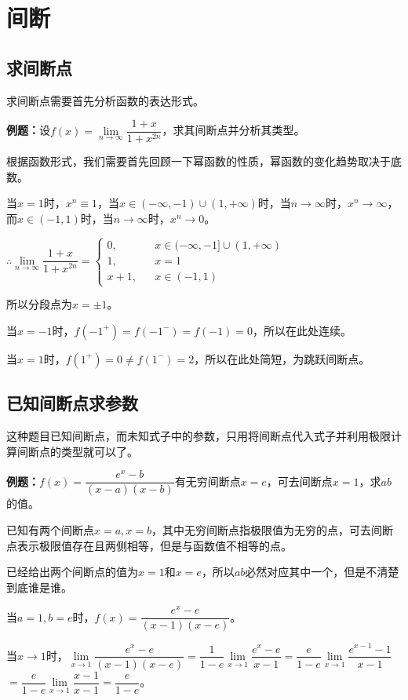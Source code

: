 \documentclass[UTF8, 12pt]{ctexart}
\begin{document}
\section{间断}

\subsection{求间断点}

求间断点需要首先分析函数的表达形式。

\textbf{例题：}设$f(x)=\lim\limits_{n\to\infty}\dfrac{1+x}{1+x^{2n}}$，求其间断点并分析其类型。

根据函数形式，我们需要首先回顾一下幂函数的性质，幂函数的变化趋势取决于底数。

当$x=1$时，$x^n\equiv 1$，当$x\in(-\infty,-1)\cup(1,+\infty)$时，当$n\to\infty$时，$x^n\to\infty$，而$x\in(-1,1)$时，当$n\to\infty$时，$x^n\to 0$。

$\therefore\lim\limits_{n\to\infty}\dfrac{1+x}{1+x^{2n}}=\left\{\begin{array}{lcl}
        0,   &  & x\in(-\infty,-1]\cup(1,+\infty) \\
        1,   &  & x=1                                        \\
        x+1, &  & x\in(-1,1)
    \end{array}
    \right.$

所以分段点为$x=\pm 1$。

当$x=-1$时，$f(-1^+)=f(-1^-)=f(-1)=0$，所以在此处连续。

当$x=1$时，$f(1^+)=0\neq f(1^-)=2$，所以在此处简短，为跳跃间断点。

\subsection{已知间断点求参数}

这种题目已知间断点，而未知式子中的参数，只用将间断点代入式子并利用极限计算间断点的类型就可以了。

\textbf{例题：}$f(x)=\dfrac{e^x-b}{(x-a)(x-b)}$有无穷间断点$x=e$，可去间断点$x=1$，求$ab$的值。

已知有两个间断点$x=a,x=b$，其中无穷间断点指极限值为无穷的点，可去间断点表示极限值存在且两侧相等，但是与函数值不相等的点。

已经给出两个间断点的值为$x=1$和$x=e$，所以$ab$必然对应其中一个，但是不清楚到底谁是谁。

当$a=1,b=e$时，$f(x)=\dfrac{e^x-e}{(x-1)(x-e)}$。\medskip

当$x\to 1$时，$\lim\limits_{x\to 1}\dfrac{e^x-e}{(x-1)(x-e)}$$=\dfrac{1}{1-e}\lim\limits_{x\to 1}\dfrac{e^x-e}{x-1}$$=\dfrac{e}{1-e}\lim\limits_{x\to 1}\dfrac{e^{x-1}-1}{x-1}$$=\dfrac{e}{1-e}\lim\limits_{x\to 1}\dfrac{x-1}{x-1}$$=\dfrac{e}{1-e}$。\medskip
\end{document}
